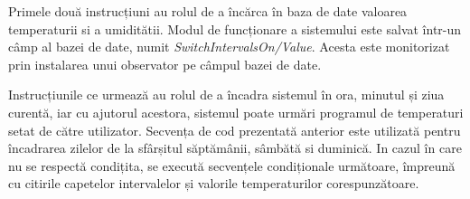 	Primele două instrucțiuni au rolul de a încărca în baza de date valoarea temperaturii si a umiditătii. Modul de funcționare a sistemului este salvat într-un câmp al bazei de date, numit \textit{SwitchIntervalsOn/Value}. Acesta este monitorizat prin instalarea unui observator pe câmpul bazei de date. 

	Instrucțiunile ce urmează au rolul de a încadra sistemul în ora, minutul și ziua curentă, iar cu ajutorul acestora, sistemul poate urmări programul de temperaturi setat de către utilizator. Secvența de cod prezentată anterior este utilizată pentru încadrarea zilelor de la sfârșitul săptămânii, sâmbătă si duminică. In cazul în care nu se respectă condițita, se execută secvențele condiționale următoare, împreună cu citirile capetelor intervalelor și valorile temperaturilor corespunzătoare.

\vspace{1em}
	
